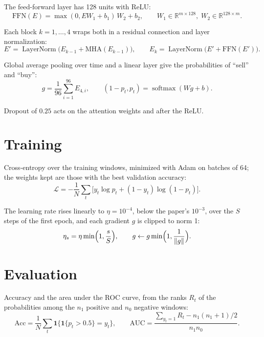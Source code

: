 \documentclass[11pt]{article}
\DeclareMathOperator{\softmax}{softmax}
\DeclareMathOperator{\LN}{LayerNorm}
\begin{document}
The feed-forward layer has 128 units with ReLU:
\begin{equation}
  \mathrm{FFN}(E) = \max(0, E W_1 + b_1)\, W_2 + b_2, \qquad
  W_1 \in \mathbb{R}^{m \times 128}, \; W_2 \in \mathbb{R}^{128 \times m}.
\end{equation}

Each block $k = 1, \dots, 4$ wraps both in a residual connection and
layer normalization:
\begin{equation}
  E' = \LN\bigl(E_{k-1} + \mathrm{MHA}(E_{k-1})\bigr), \qquad
  E_k = \LN\bigl(E' + \mathrm{FFN}(E')\bigr).
\end{equation}

Global average pooling over time and a linear layer give the
probabilities of ``sell'' and ``buy'':
\begin{equation}
  g = \frac{1}{96} \sum_{i=1}^{96} E_{4,i}, \qquad
  (1 - p_t, p_t) = \softmax(W g + b).
\end{equation}

Dropout of $0.25$ acts on the attention weights and after the ReLU.

\section{Training}

Cross-entropy over the training windows, minimized with Adam on batches
of 64; the weights kept are those with the best validation accuracy:
\begin{equation}
  \mathcal{L} = -\frac{1}{N} \sum_{t} \bigl[ y_t \log p_t
    + (1 - y_t) \log (1 - p_t) \bigr].
\end{equation}

The learning rate rises linearly to $\eta = 10^{-4}$, below the paper's
$10^{-3}$, over the $S$ steps of the first epoch, and each gradient $g$ is
clipped to norm 1:
\begin{equation}
  \eta_s = \eta \min\Bigl(1, \frac{s}{S}\Bigr), \qquad
  g \leftarrow g \min\Bigl(1, \frac{1}{\lVert g \rVert}\Bigr).
\end{equation}

\section{Evaluation}

Accuracy and the area under the ROC curve, from the ranks $R_t$ of the
probabilities among the $n_1$ positive and $n_0$ negative windows:
\begin{equation}
  \mathrm{Acc} = \frac{1}{N} \sum_t \mathbf{1}\{\mathbf{1}\{p_t > 0.5\}
    = y_t\}, \qquad
  \mathrm{AUC} = \frac{\sum_{y_t = 1} R_t - n_1 (n_1 + 1)/2}{n_1 n_0}.
\end{equation}
\end{document}
